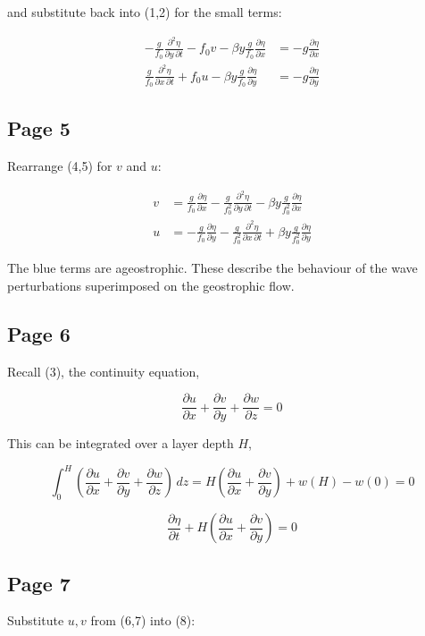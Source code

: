 \documentclass[11pt]{article}
\begin{document}
and substitute back into (1,2) for the small terms:

\begin{align}
-\frac{g}{f_0}\frac{\partial^2 \eta}{\partial y\,\partial t}
-f_0v
-\beta y \frac{g}{f_0}\frac{\partial \eta}{\partial x}
&=
-g\frac{\partial \eta}{\partial x}
\tag{4}\\[6pt]
\frac{g}{f_0}\frac{\partial^2 \eta}{\partial x\,\partial t}
+f_0u
-\beta y \frac{g}{f_0}\frac{\partial \eta}{\partial y}
&=
-g\frac{\partial \eta}{\partial y}
\tag{5}
\end{align}

\subsection*{Page 5}
Rearrange (4,5) for $v$ and $u$:

\begin{align}
v
&=
\frac{g}{f_0}\frac{\partial \eta}{\partial x}
-\frac{g}{f_0^2}\frac{\partial^2 \eta}{\partial y\,\partial t}
-\beta y \frac{g}{f_0^2}\frac{\partial \eta}{\partial x}
\tag{6}\\[6pt]
u
&=
-\frac{g}{f_0}\frac{\partial \eta}{\partial y}
-\frac{g}{f_0^2}\frac{\partial^2 \eta}{\partial x\,\partial t}
+\beta y \frac{g}{f_0^2}\frac{\partial \eta}{\partial y}
\tag{7}
\end{align}

The blue terms are ageostrophic. These describe the behaviour of the wave
perturbations superimposed on the geostrophic flow.

\subsection*{Page 6}
Recall (3), the continuity equation,

\[
\frac{\partial u}{\partial x}
+\frac{\partial v}{\partial y}
+\frac{\partial w}{\partial z}
=
0
\tag{3}
\]

This can be integrated over a layer depth $H$,

\[
\int_0^H
\left(
\frac{\partial u}{\partial x}
+\frac{\partial v}{\partial y}
+\frac{\partial w}{\partial z}
\right)\,dz
=
H\left(
\frac{\partial u}{\partial x}
+\frac{\partial v}{\partial y}
\right)
+w(H)-w(0)
=
0
\]

\[
\frac{\partial \eta}{\partial t}
+
H\left(
\frac{\partial u}{\partial x}
+\frac{\partial v}{\partial y}
\right)
=
0
\tag{8}
\]

\subsection*{Page 7}
Substitute $u,v$ from (6,7) into (8):
\end{document}
